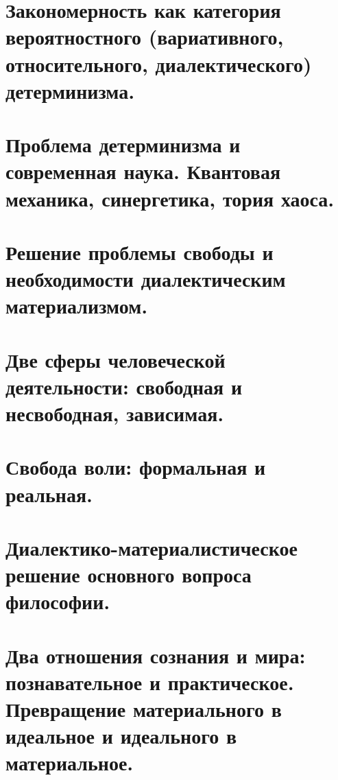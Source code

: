 \section{ Закономерность как категория вероятностного (вариативного, относительного, диалектического) детерминизма.}
\section{ Проблема детерминизма и современная наука. Квантовая механика, синергетика, тория хаоса.}
\section{ Решение проблемы свободы и необходимости диалектическим материализмом.}
\section{ Две сферы человеческой деятельности: свободная и несвободная, зависимая.}
\section{ Свобода воли: формальная и реальная.}
\section{ Диалектико-материалистическое решение основного вопроса философии.}
\section{ Два отношения сознания и мира: познавательное и практическое. Превращение материального в идеальное и идеального в материальное. }


